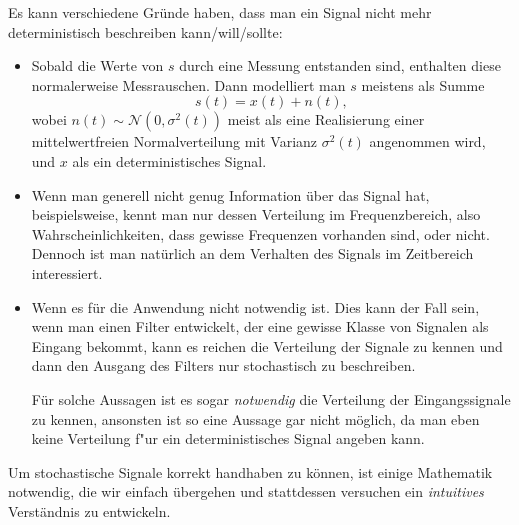 Es kann verschiedene Gr\"unde haben, dass man ein Signal nicht mehr deterministisch beschreiben kann/will/sollte:
%
\begin{itemize}
    \item Sobald die Werte von $s$ durch eine Messung entstanden sind, enthalten diese normalerweise Messrauschen.
    Dann modelliert man $s$ meistens als Summe
    \[
    s(t) = x(t) + n(t),
    \]
    wobei $n(t) \sim \mathcal{N}(0, \sigma^2(t))$ meist als eine Realisierung einer mittelwertfreien Normalverteilung mit Varianz $\sigma^2(t)$ angenommen wird, und $x$ als ein deterministisches Signal.
    \item Wenn man generell nicht genug Information \"uber das Signal hat, beispielsweise, kennt man nur dessen Verteilung im Frequenzbereich, also Wahrscheinlichkeiten, dass gewisse Frequenzen vorhanden sind, oder nicht.
    Dennoch ist man nat\"urlich an dem Verhalten des Signals im Zeitbereich interessiert.
    \item Wenn es f\"ur die Anwendung nicht notwendig ist.
    Dies kann der Fall sein, wenn man einen Filter entwickelt, der eine gewisse Klasse von Signalen als Eingang bekommt, kann es reichen die Verteilung der Signale zu kennen und dann den Ausgang des Filters nur stochastisch zu beschreiben.


    F\"ur solche Aussagen ist es sogar \emph{notwendig} die Verteilung der Eingangssignale zu kennen, ansonsten ist so eine Aussage gar nicht m\"oglich, da man eben keine Verteilung f"ur ein deterministisches Signal angeben kann.
\end{itemize}
%
%
Um stochastische Signale korrekt handhaben zu k\"onnen, ist einige Mathematik notwendig, die wir einfach \"ubergehen und stattdessen versuchen ein \emph{intuitives} Verst\"andnis zu entwickeln.
%
%
